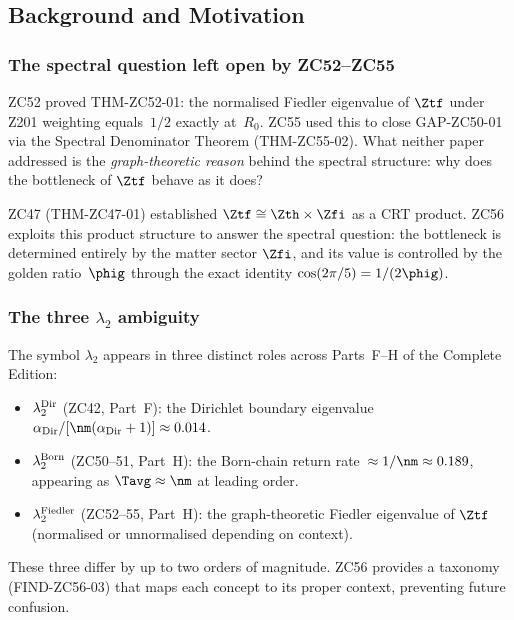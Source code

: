 \documentclass[12pt, a4paper]{article}
\begin{document}
\bigskip
\subsection{Background and Motivation}

\subsubsection{The spectral question left open by ZC52--ZC55}

ZC52 proved THM-ZC52-01: the normalised Fiedler eigenvalue of
$\Ztf$ under Z201 weighting equals~$1/2$ exactly at~$R_0$.
ZC55 used this to close GAP-ZC50-01 via the Spectral Denominator
Theorem (THM-ZC55-02).  What neither paper addressed is the
\emph{graph-theoretic reason} behind the spectral structure: why
does the bottleneck of $\Ztf$ behave as it does?

ZC47 (THM-ZC47-01) established $\Ztf\cong\Zth\times\Zfi$ as a
CRT product.  ZC56 exploits this product structure to answer the
spectral question: the bottleneck is determined entirely by the
matter sector $\Zfi$, and its value is controlled by the golden
ratio~$\phig$ through the exact identity
$\cos(2\pi/5)=1/(2\phig)$.

\subsubsection{The three $\lambda_2$ ambiguity}

The symbol $\lambda_2$ appears in three distinct roles across
Parts~F--H of the Complete Edition:

\begin{itemize}[leftmargin=2em, noitemsep]
\item \textbf{$\lambda_2^{\rm Dir}$} (ZC42, Part~F):
  the Dirichlet boundary eigenvalue
  $\alpha_{\rm Dir}/[\nm(\alpha_{\rm Dir}+1)]\approx0.014$.
\item \textbf{$\lambda_2^{\rm Born}$} (ZC50--51, Part~H):
  the Born-chain return rate~$\approx1/\nm\approx0.189$,
  appearing as $\Tavg\approx\nm$ at leading order.
\item \textbf{$\lambda_2^{\rm Fiedler}$} (ZC52--55, Part~H):
  the graph-theoretic Fiedler eigenvalue of $\Ztf$
  (normalised or unnormalised depending on context).
\end{itemize}

These three differ by up to two orders of magnitude.
ZC56 provides a taxonomy (FIND-ZC56-03) that maps each concept
to its proper context, preventing future confusion.
\end{document}
